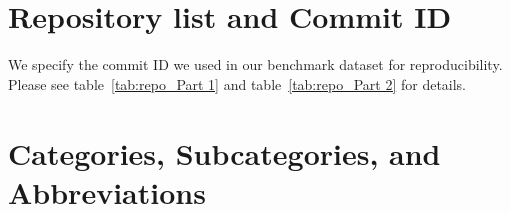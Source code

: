 
\vspace{-0.5em}
\section{Repository list and Commit ID}

We specify the commit ID we used in our benchmark dataset for reproducibility. Please see table~\ref{tab:repo_Part 1} and table~\ref{tab:repo_Part 2} for details.

\vspace{-0.5em}
\section{Categories, Subcategories, and Abbreviations}

